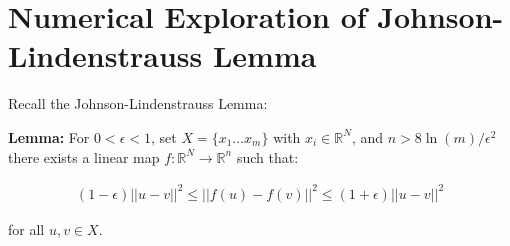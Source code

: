 \documentclass{article}
\begin{document}
    \pagebreak

\section{Numerical Exploration of Johnson-Lindenstrauss Lemma}

    Recall the Johnson-Lindenstrauss Lemma:

    \textbf{Lemma:} For $0<\epsilon<1$, set $X= \{ x_1 \ldots x_m \}$ with $x_i \in \mathbb{R}^N$, and $ n > 8 \ln(m)/ \epsilon^2$ there exists a linear map $f: \mathbb{R}^N \rightarrow \mathbb{R}^n$ such that:

    \begin{align*}
        (1 - \epsilon) ||u - v||^2 \leq ||f(u) - f(v)||^2 \leq (1 + \epsilon) ||u - v||^2
    \end{align*}

    for all $u,v \in X$.
\end{document}
